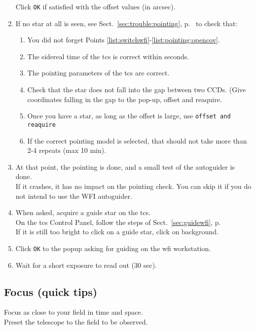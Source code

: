 \documentclass[11pt,fleqn]{book}
\def\secref#1{Sect.~\ref{sec:#1}, p.~\pageref{sec:#1}}
\begin{document}
\begin{enumerate}
        Click \texttt{OK} if satisfied with the offset values (in arcsec).
  \item If no star at all is seen, see 
    \secref{trouble:pointing} to check that:
    \begin{enumerate}
      \item You did not forget Points \ref{list:switchwfi}-\ref{list:pointing:opencov}.
      \item The sidereal time of the \gls{tcs} is correct within seconds.
      \item The pointing parameters of the \gls{tcs} are correct.
      \item Check that the star does not fall into the gap between two CCDs. (Give coordinates falling in the gap to the pop-up, offset and reaquire. 
      \item Once you have a star, as long as the offset is large, use \texttt{offset and reaquire}
      \item If the correct pointing model is selected, that should not take more than 2-4 repeats (max 10 min).
    \end{enumerate}
  \item At that point, the pointing is done, and a small test of the
        autoguider is done.\\
        If it crashes, it has no impact on the pointing
        check.  You can skip it if you do not intend to use the WFI autoguider.
  \item When asked, acquire a guide star on the \gls{tcs}.\\
        On the \gls{tcs} Control Panel, follow the steps of \secref{guidewfi}\\
        If it is still too bright to click on a guide star, click on background.
  \item Click \texttt{OK} to the popup asking for guiding on the \gls{wfi} workstation.
  \item Wait for a short exposure to read out (30 sec).
\end{enumerate}

\subsection{Focus (quick tips)}

Focus as close to your field in time and space. \\
Preset the telescope to the field to be observed.
\end{document}
